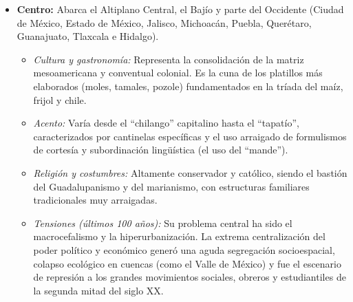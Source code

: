 \begin{itemize}
    \item \textbf{Centro:} Abarca el Altiplano Central, el Bajío y parte del
    Occidente (Ciudad de México, Estado de México, Jalisco, Michoacán, Puebla,
    Querétaro, Guanajuato, Tlaxcala e Hidalgo).
    \begin{itemize}
        \item \textit{Cultura y gastronomía:} Representa la consolidación de la matriz
                mesoamericana y conventual colonial. Es la cuna de los platillos más
                elaborados (moles, tamales, pozole) fundamentados en la tríada del maíz, frijol y chile.
        \item \textit{Acento:} Varía desde el ``chilango'' capitalino hasta el ``tapatío'',
                caracterizados por cantinelas específicas y el uso arraigado de formulismos de
                cortesía y subordinación lingüística (el uso del ``mande'').
        \item \textit{Religión y costumbres:} Altamente conservador y católico, siendo el
                bastión del Guadalupanismo y del marianismo, con estructuras familiares
                tradicionales muy arraigadas.
        \item \textit{Tensiones (últimos 100 años):} Su problema central ha sido el
                macrocefalismo y la hiperurbanización. La extrema centralización del poder
                político y económico generó una aguda segregación socioespacial, colapso
                ecológico en cuencas (como el Valle de México) y fue el escenario de represión
                a los grandes movimientos sociales, obreros y estudiantiles de la segunda mitad
                del siglo XX.
    \end{itemize}


\end{itemize}
